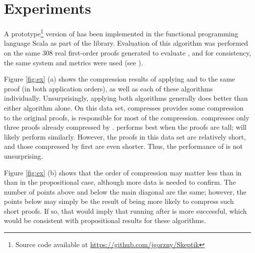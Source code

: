 \section{Experiments} \label{sec:exp}
A prototype\footnote{Source code available at \url{https://github.com/jgorzny/Skeptik}} version of {\FORPI} has been implemented in the functional programming language Scala as part of the \skeptik
 library. %
Evaluation of this algorithm was performed on the same 308 real first-order proofs generated to evaluate {\GFOLU}, and for consistency, the same system and metrics were used (see \cite{GFOLU}).

Figure \ref{fig:ex} (a) shows the compression results of applying {\FORPI} and {\GFOLU} to the same proof (in both application orders), as well as each of these algorithms individually. Unsurprisingly, applying both algorithms generally does better than either algorithm alone. On this data set, {\FORPI} compresses provides some compression to the original proofs, {\GFOLU} is responsible for most of the compression. {\FORPI} compresses only three proofs already compressed by {\GFOLU}.
{\RPI} performs best when the proofs are tall; {\FORPI} will likely perform similarly. However, the proofs in this data set are relatively short, and those compressed by {\GFOLU} first are even shorter. Thus, the performance of {\FORPI} is not unsurprising.

Figure \ref{fig:ex} (b) shows that the order of compression may matter less than in than in the propositional case, although more data is needed to confirm. The number of points above and below the main diagonal are the same; however, the points below may simply be the result of {\GFOLU} being more likely to compress such short proofs. If so, that would imply that running {\FORPI} after {\GFOLU} is more successful, which would be consistent with propositional results for these algorithms.



